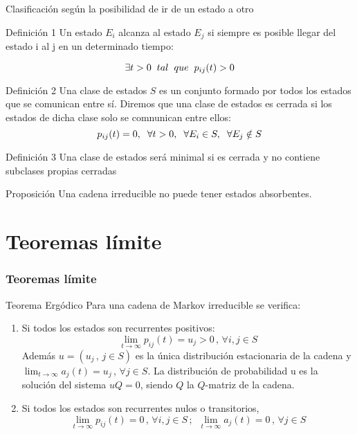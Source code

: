 \documentclass{beamer}
\begin{document}
\begin{frame}{Clasificación según la posibilidad de ir de un estado a otro}
\begin{block}{Definición 1}
   	Un estado $E_{i}$ alcanza al estado $E_{j}$ si siempre es posible llegar del estado i al j en un determinado tiempo:

   	\begin{equation*}
   		\exists t > 0 \hspace{0.2cm}tal \hspace{0.2cm} que \hspace{0.2cm} p_{ij}(t) > 0
   	\end{equation*}
\end{block}
\begin{block}{Definición 2}
Una clase de estados $S$ es un conjunto formado por todos los estados que se comunican entre sí. Diremos que una clase de estados es cerrada si los estados de dicha clase solo se comnunican entre ellos: $$p_{ij}(t)=0, \hspace{0.2cm} \forall t >0,\hspace{0.2cm} \forall E_{i} \in S,\hspace{0.2cm} \forall E_{j} \notin S$$
\end{block}
\end{frame}
\begin{frame}
\begin{block}{Definición 3}
Una clase de estados será minimal si es cerrada y no contiene subclases propias cerradas
\end{block}
\begin{block}{Proposición}
	Una cadena irreducible no puede tener estados absorbentes. 
\end{block}
\end{frame}
\section{Teoremas límite}
\begin{frame}
    \frametitle{Teoremas límite}
    \begin{block}{Teorema Ergódico}
    Para una cadena de Markov irreducible se verifica:
	\begin{enumerate}
    \item Si todos los estados son recurrentes positivos:
$$\lim_{t\rightarrow\infty}p_{ij}(t)=u_j>0 \, , \, \forall i,j\in S$$
Además $u=(u_j \, , \, j\in S)$ es la única distribución estacionaria de la cadena y $\displaystyle\lim_{t\rightarrow\infty}a_j (t)=u_j \, , \, \forall j\in S$. La distribución de probabilidad u es la solución del sistema $uQ=0$, siendo $Q$ la $Q$-matriz de la cadena.
\item Si todos los estados son recurrentes nulos o transitorios,
$$\lim_{t\rightarrow\infty}p_{ij}(t)=0\, , \, \forall i,j \in S\, ;\,\,\, \lim_{t\rightarrow\infty}a_j (t)=0\, , \, \forall j\in S$$
\end{enumerate}
    \end{block}
\end{frame}
\end{document}

